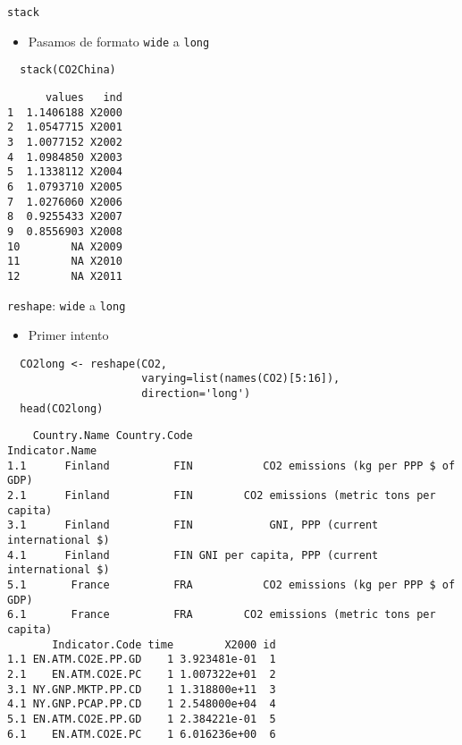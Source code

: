 \documentclass[xcolor={usenames,svgnames,dvipsnames}]{beamer}
\begin{document}
\begin{frame}[fragile,label=sec-4-2]{\texttt{stack}}
 \begin{itemize}
\item Pasamos de formato \texttt{wide} a \texttt{long}
\end{itemize}
\lstset{language=R,label= ,caption= ,numbers=none}
\begin{lstlisting}
  stack(CO2China)
\end{lstlisting}

\begin{verbatim}
      values   ind
1  1.1406188 X2000
2  1.0547715 X2001
3  1.0077152 X2002
4  1.0984850 X2003
5  1.1338112 X2004
6  1.0793710 X2005
7  1.0276060 X2006
8  0.9255433 X2007
9  0.8556903 X2008
10        NA X2009
11        NA X2010
12        NA X2011
\end{verbatim}
\end{frame}

\begin{frame}[fragile,label=sec-4-3]{\texttt{reshape}: \texttt{wide} a \texttt{long}}
 \begin{itemize}
\item Primer intento
\end{itemize}
\lstset{language=R,label= ,caption= ,numbers=none}
\begin{lstlisting}
  CO2long <- reshape(CO2,
                     varying=list(names(CO2)[5:16]),
                     direction='long')
  head(CO2long)
\end{lstlisting}

\begin{verbatim}
    Country.Name Country.Code                                Indicator.Name
1.1      Finland          FIN           CO2 emissions (kg per PPP $ of GDP)
2.1      Finland          FIN        CO2 emissions (metric tons per capita)
3.1      Finland          FIN            GNI, PPP (current international $)
4.1      Finland          FIN GNI per capita, PPP (current international $)
5.1       France          FRA           CO2 emissions (kg per PPP $ of GDP)
6.1       France          FRA        CO2 emissions (metric tons per capita)
       Indicator.Code time        X2000 id
1.1 EN.ATM.CO2E.PP.GD    1 3.923481e-01  1
2.1    EN.ATM.CO2E.PC    1 1.007322e+01  2
3.1 NY.GNP.MKTP.PP.CD    1 1.318800e+11  3
4.1 NY.GNP.PCAP.PP.CD    1 2.548000e+04  4
5.1 EN.ATM.CO2E.PP.GD    1 2.384221e-01  5
6.1    EN.ATM.CO2E.PC    1 6.016236e+00  6
\end{verbatim}
\end{frame}
\end{document}
